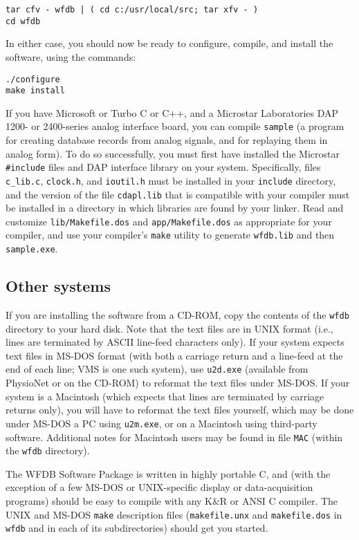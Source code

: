 \documentclass[twoside]{article}
\begin{document}
\begin{verbatim}
tar cfv - wfdb | ( cd c:/usr/local/src; tar xfv - )
cd wfdb
\end{verbatim}

In either case, you should now be ready to configure, compile, and install
the software, using the commands:

\begin{verbatim}
./configure
make install
\end{verbatim}

If you have Microsoft or Turbo C or C++, and a Microstar Laboratories DAP 1200-
or 2400-series analog interface board, you can compile {\tt sample} (a program
for creating database records from analog signals, and for replaying them in
analog form).  To do so successfully, you must first have installed the
Microstar {\tt \#include} files and DAP interface library on your system.
Specifically, files {\tt c\_lib.c}, {\tt clock.h}, and {\tt ioutil.h} must be
installed in your {\tt include} directory, and the version of the file
{\tt cdapl.lib} that is compatible with your compiler must be installed in a
directory in which libraries are found by your linker.  Read and customize
{\tt lib/Makefile.dos} and {\tt app/Makefile.dos} as appropriate for your
compiler, and use your compiler's {\tt make} utility to generate {\tt wfdb.lib}
and then {\tt sample.exe}.

\subsection*{Other systems}

If you are installing the software from a CD-ROM, copy the contents of the
{\tt wfdb} directory to your hard disk.  Note that the text files are in
UNIX format (i.e., lines are terminated by ASCII line-feed characters only).
If your system expects text files in MS-DOS format (with both a carriage return
and a line-feed at the end of each line; VMS is one such system), use
{\tt u2d.exe} (available from PhysioNet or on the CD-ROM) to reformat the
text files under MS-DOS.  If your system is a Macintosh (which expects that
lines are terminated by carriage returns only), you will have to reformat the
text files yourself, which may be done under MS-DOS a PC using {\tt u2m.exe},
or on a Macintosh using third-party software.  Additional notes for Macintosh
users may be found in file {\tt MAC} (within the {\tt wfdb} directory).

The WFDB Software Package is written in highly portable C, and (with the
exception of a few MS-DOS or UNIX-specific display or data-acquisition
programs) should be easy to compile with any K\&R or ANSI C compiler.
The UNIX and MS-DOS {\tt make} description files ({\tt makefile.unx}
and {\tt makefile.dos} in {\tt wfdb} and in each of its subdirectories)
should get you started.
\end{document}
